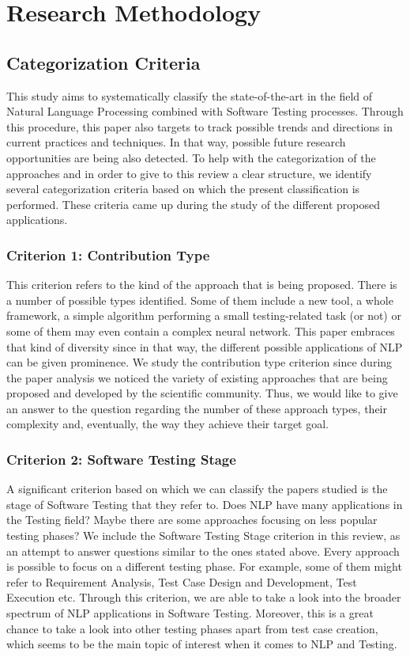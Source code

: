 \chapter{Research Methodology}

\section {Categorization Criteria}
This study aims to systematically classify the state-of-the-art in the field of Natural Language Processing combined with Software Testing 
processes. Through this procedure, this paper also targets to track possible trends and directions in current practices and techniques. In that 
way, possible future research opportunities are being also detected. To help with the categorization of the approaches and in order to give to this review a 
clear structure, we identify several categorization criteria based on which the present classification is performed. These criteria came up during the study of 
the different proposed applications. 

\subsection {Criterion 1: Contribution Type}
This criterion refers to the kind of the approach that is being proposed. There is a number of possible types identified. Some of them include a new tool, 
a whole framework, a simple algorithm performing a small testing-related task (or not) or some of them may even contain a complex neural network. This paper embraces that kind of 
diversity since in that way, the different possible applications of NLP can be given prominence. We study the contribution type criterion since during the paper analysis we 
noticed the variety of existing approaches that are being proposed and developed by the scientific community. Thus, we would like to give an answer to the question regarding 
the number of these approach types, their complexity and, eventually, the way they achieve their target goal.

\subsection {Criterion 2: Software Testing Stage}
A significant criterion based on which we can classify the papers studied is the stage of Software Testing that they refer to. Does NLP have many applications in the Testing field? 
Maybe there are some approaches focusing on less popular testing phases? We include the Software Testing Stage criterion in this review, as an attempt to answer questions similar 
to the ones stated above. Every approach is possible to focus on a different testing phase. For example, some of them might refer to Requirement Analysis, Test Case Design and Development, Test 
Execution etc. Through this criterion, we are able to take a look into the broader spectrum of NLP applications in Software Testing. Moreover, this is a great chance to take a 
look into other testing phases apart from test case creation, which seems to be the main topic of interest when it comes to NLP and Testing.

